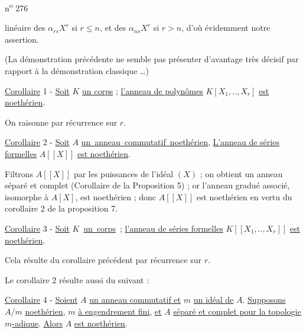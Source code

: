 n\textsuperscript{o} 276

linéaire des $\alpha_{rs}X^r$ si $r\leq n$, et des $\alpha_{ns}X^r$ si $r>n$, d'où évidemment notre assertion.

(La démonstration précédente ne semble pas présenter d'avantage très décisif par rapport à la démonstration classique \ldots)

\uline{Corollaire} 1 - \uline{Soit} $K$ \uline{un corps} ; \uline{l'anneau de polynômes} $K[X_1,..,X_r]$ \uline{est noethérien}.

On raisonne par récurrence sur $r$.

\uline{Corollaire} 2 - \uline{Soit} $A$ \mbox{\settowidth{\unitlength}{un anneau commutatif noethérien,}\uline{un anneau commutatif noethérien},} \uline{L'anneau de séries formelles} $A[[X]]$ \uline{est noethérien}.

Filtrons $A[[X]]$ par les puissances de l'idéal $(X)$ ; on obtient un anneau séparé et complet (Corollaire de la Proposition 5) ; or l'anneau gradué associé, isomorphe à $A[X]$, est noethérien ; donc $A[[X]]$ est noethérien en vertu du corollaire 2 de la proposition 7.

\uline{Corollaire} 3 - \uline{Soit} \mbox{\settowidth{\unitlength}{$K$ un corps ;}$K$ \uline{un corps} ;} \uline{l'anneau de séries formelles} $K[[X_1,..,X_r]]$ \uline{est noethérien}.

Cela résulte du corollaire précédent par récurrence sur $r$.

Le corollaire 2 résulte aussi du suivant :

\uline{Corollaire} 4 - \uline{Soient} $A$ \uline{un anneau commutatif et} $m$ \uline{un idéal de} $A$. \uline{Supposons} $A/m$ \uline{noethérien}, $m$ \uline{à engendrement fini}, \uline{et} $A$ \uline{séparé et complet pour la topologie} $m$\uline{-adique}. \uline{Alors} $A$ \uline{est noethérien}.


